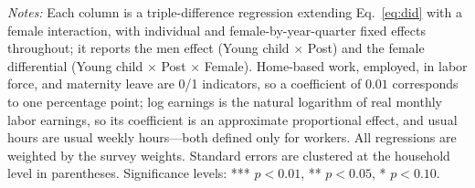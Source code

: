 \begin{table}[H]
   \par \raggedright 
   \footnotesize\textit{Notes:} Each column is a triple-difference regression extending Eq.~\eqref{eq:did} with a female interaction, with individual and female-by-year-quarter fixed effects throughout; it reports the men effect (Young child $\times$ Post) and the female differential (Young child $\times$ Post $\times$ Female). Home-based work, employed, in labor force, and maternity leave are 0/1 indicators, so a coefficient of $0.01$ corresponds to one percentage point; log earnings is the natural logarithm of real monthly labor earnings, so its coefficient is an approximate proportional effect, and usual hours are usual weekly hours---both defined only for workers. All regressions are weighted by the survey weights. Standard errors are clustered at the household level in parentheses. Significance levels: *** $p<0.01$, ** $p<0.05$, * $p<0.10$.
\end{table}


